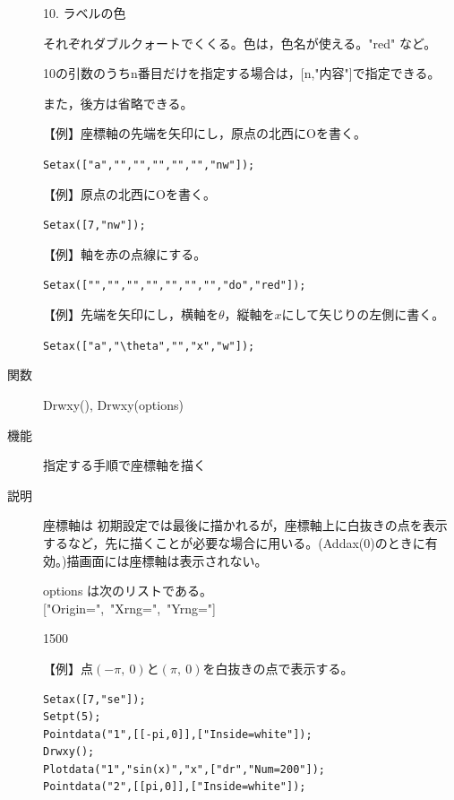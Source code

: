 \documentclass[papersize,a4paper,10pt,uplatex]{jsarticle}
\begin{document}
\begin{description}
10. ラベルの色

それぞれダブルクォートでくくる。色は，色名が使える。"red" など。

10の引数のうちn番目だけを指定する場合は，[n,"内容"]で指定できる。

また，後方は省略できる。

\vspace{\baselineskip}
【例】座標軸の先端を矢印にし，原点の北西にOを書く。

\hspace{10mm} \verb|Setax(["a","","","","","","nw"]);|

【例】原点の北西にOを書く。

\hspace{10mm}\verb|Setax([7,"nw"]);|

【例】軸を赤の点線にする。

\hspace{10mm}\verb|Setax(["","","","","","","","do","red"]);|

【例】先端を矢印にし，横軸を$\theta$，縦軸を$x$にして矢じりの左側に書く。

\hspace{10mm} \verb|Setax(["a","\theta","","x","w"]);|

\vspace{\baselineskip}
\hspace{10mm}


\vspace{\baselineskip}
\hypertarget{drwxy}{}
\item[関数]Drwxy(), Drwxy(options)
\item[機能]指定する手順で座標軸を描く
\item[説明]座標軸は 初期設定では最後に描かれるが，座標軸上に白抜きの点を表示するなど，先に描くことが必要な場合に用いる。(Addax(0)のときに有効。)描画面には座標軸は表示されない。

options は次のリストである。\\
\hspace*{10mm}["Origin=",\ "Xrng=",\ "Yrng="]

\begin{layer}{150}{0}
\end{layer}

【例】点$(-\pi,\ 0)$と$(\pi,\ 0)$を白抜きの点で表示する。
\begin{verbatim}
Setax([7,"se"]);
Setpt(5);
Pointdata("1",[[-pi,0]],["Inside=white"]);
Drwxy();
Plotdata("1","sin(x)","x",["dr","Num=200"]);
Pointdata("2",[[pi,0]],["Inside=white"]);
\end{verbatim}


\end{description}
\end{document}
